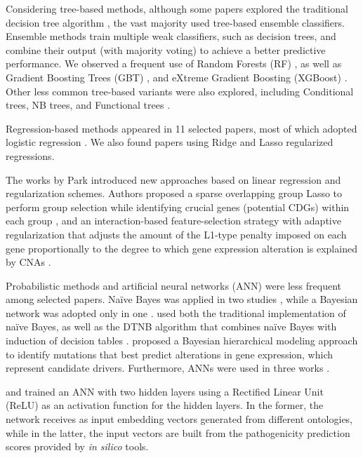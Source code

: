 Considering tree-based methods, although some papers explored the traditional decision tree algorithm \cite{Schroeder2014, U2014, Wang2020}, the vast majority used tree-based ensemble classifiers. Ensemble methods train multiple weak classifiers, such as decision trees, and combine their output (\eg with majority voting) to achieve a better predictive performance. We observed a frequent use of Random Forests (RF) \cite{Carter2009, Schroeder2014, U2014, Tokheim2016, Agajanian2018, Celli2018, Agajanian2019, Nicora2019, Chandrashekar2020, Colaprico2020, Cutigi2020, Gumpinger2020, Lyu2020, Wang2020}, as well as Gradient Boosting Trees (GBT) \cite{Zhou2018, Agajanian2018}, and eXtreme Gradient Boosting (XGBoost) \cite{Lyu2020, Wang2020}. Other less common tree-based variants were also explored, including Conditional trees, NB trees, and Functional trees \cite{Schroeder2014}.

Regression-based methods appeared in 11 selected papers, most of which adopted logistic regression \cite{Schroeder2014, Gnad2015, Soliman2015, Dong2016, Agajanian2018, Gumpinger2020, Lyu2020}. We also found papers using Ridge \cite{Nicora2019} and Lasso \cite{Davoli2013} regularized regressions. 

The works by Park \etal \cite{Park2015, Park2017} introduced new approaches based on linear regression and regularization schemes. Authors proposed a sparse overlapping group Lasso to perform group selection while identifying crucial genes (\ie potential CDGs) within each group \cite{Park2015}, and an interaction-based feature-selection strategy with adaptive regularization that adjusts the amount of the L1-type penalty imposed on each gene proportionally to the degree to which gene expression alteration is explained by CNAs \cite{Park2017}.


Probabilistic methods and artificial neural networks (ANN) were less frequent among selected papers. Naïve Bayes was applied in two studies \cite{Schroeder2014, U2014}, while a Bayesian network was adopted only in one \cite{U2014}. \citet{U2014} used both the traditional implementation of naïve Bayes, as well as the DTNB algorithm that combines naïve Bayes with induction of decision tables \cite{hall2008combining}. \citet{Wang2018} proposed a Bayesian hierarchical modeling approach to identify mutations that best predict alterations in gene expression, which represent candidate drivers.
Furthermore, ANNs were used in three works \cite{U2014, Althubaiti2019, Wang2020}.

\citet{Althubaiti2019} and \citet{Wang2020} trained an ANN with two hidden layers using a Rectified Linear Unit (ReLU) as an activation function for the hidden layers. In the former, the network receives as input embedding vectors generated from different ontologies, while in the latter, the input vectors are built from the pathogenicity prediction scores provided by \textit{in silico} tools.


